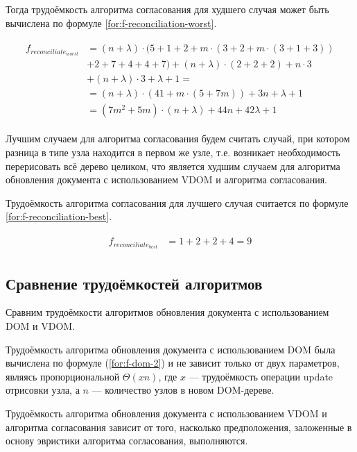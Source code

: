 Тогда трудоёмкость алгоритма согласования для худшего случая может быть вычислена по формуле \ref{for:f-reconciliation-worst}.

\begin{align}
	\begin{split}
		\label{for:f-reconciliation-worst}
		f_{reconciliate_{worst}} &= (n + \lambda) \cdot (5 + 1 + 2 + m \cdot (3 + 2 + m \cdot (3 + 1 + 3)) \\
		&+ 2 + 7 + 4 + 4 + 7) + (n + \lambda) \cdot (2 + 2 + 2) + n \cdot 3 \\
		&+ (n + \lambda) \cdot 3 + \lambda + 1 =\\
		&= (n + \lambda) \cdot (41 + m \cdot (5 + 7m)) + 3n + \lambda + 1 \\
		&= (7m^2 + 5m)\cdot(n + \lambda) + 44n + 42\lambda + 1
	\end{split}
\end{align}

Лучшим случаем для алгоритма согласования будем считать случай, при котором разница в типе узла находится в первом же узле, т.е. возникает необходимость перерисовать всё дерево целиком, что является худшим случаем для алгоритма обновления документа с использованием VDOM и алгоритма согласования.

Трудоёмкость алгоритма согласования для лучшего случая считается по формуле \ref{for:f-reconciliation-best}.

\begin{align}
	\begin{split}
		\label{for:f-reconciliation-best}
		f_{reconciliate_{best}} &= 1 + 2 + 2 + 4 = 9
	\end{split}
\end{align}

\subsection{Сравнение трудоёмкостей алгоритмов}

Сравним трудоёмкости алгоритмов обновления документа с использованием DOM и VDOM.

Трудоёмкость алгоритма обновления документа с использованием DOM была вычислена по формуле (\ref{for:f-dom-2}) и не зависит только от двух параметров, являясь пропорциональной $\Theta(xn)$, где $x$ --- трудоёмкость операции update отрисовки узла, а $n$ --- количество узлов в новом DOM-дереве.

Трудоёмкость алгоритма обновления документа с использованием VDOM и алгоритма согласования зависит от того, насколько предположения, заложенные в основу эвристики алгоритма согласования, выполняются.

